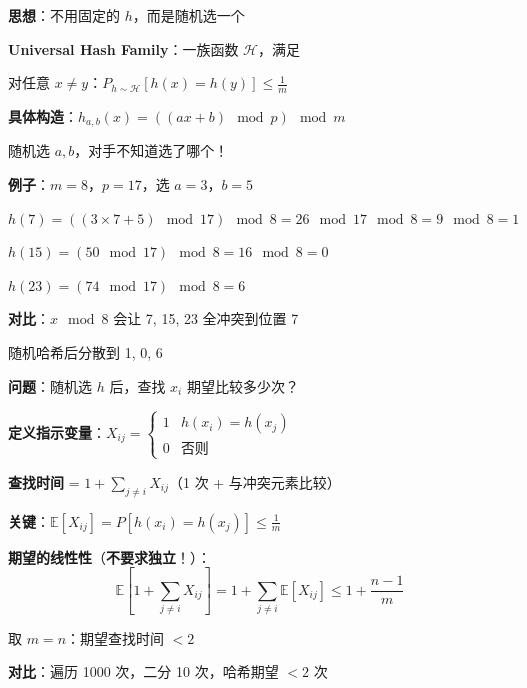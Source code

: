 \documentclass[12pt, a4paper]{ctexart}
\begin{document}
\begin{blackboard}

\textbf{思想}：不用固定的 $h$，而是随机选一个

\textbf{Universal Hash Family}：一族函数 $\mathcal{H}$，满足

对任意 $x \neq y$：$P_{h \sim \mathcal{H}}[h(x) = h(y)] \leq \frac{1}{m}$

\textbf{具体构造}：$h_{a,b}(x) = ((ax + b) \mod p) \mod m$

随机选 $a, b$，对手不知道选了哪个！

\textbf{例子}：$m=8$，$p=17$，选 $a=3$，$b=5$

$h(7) = ((3 \times 7 + 5) \mod 17) \mod 8 = 26 \mod 17 \mod 8 = 9 \mod 8 = 1$

$h(15) = (50 \mod 17) \mod 8 = 16 \mod 8 = 0$

$h(23) = (74 \mod 17) \mod 8 = 6$

\textbf{对比}：$x \mod 8$ 会让 7, 15, 23 全冲突到位置 7

随机哈希后分散到 1, 0, 6

\end{blackboard}

\begin{blackboard}[期望分析]

\textbf{问题}：随机选 $h$ 后，查找 $x_i$ 期望比较多少次？

\textbf{定义指示变量}：$X_{ij} = \begin{cases} 1 & h(x_i) = h(x_j) \\ 0 & \text{否则} \end{cases}$

\textbf{查找时间} = $1 + \sum_{j \neq i} X_{ij}$（1 次 + 与冲突元素比较）

\textbf{关键}：$\mathbb{E}[X_{ij}] = P[h(x_i) = h(x_j)] \leq \frac{1}{m}$

\textbf{期望的线性性}（\textbf{不要求独立}！）：
\[
\mathbb{E}\left[1 + \sum_{j \neq i} X_{ij}\right] = 1 + \sum_{j \neq i} \mathbb{E}[X_{ij}] \leq 1 + \frac{n-1}{m}
\]

取 $m = n$：期望查找时间 $< 2$

\textbf{对比}：遍历 1000 次，二分 10 次，哈希期望 $< 2$ 次

\end{blackboard}
\end{document}
